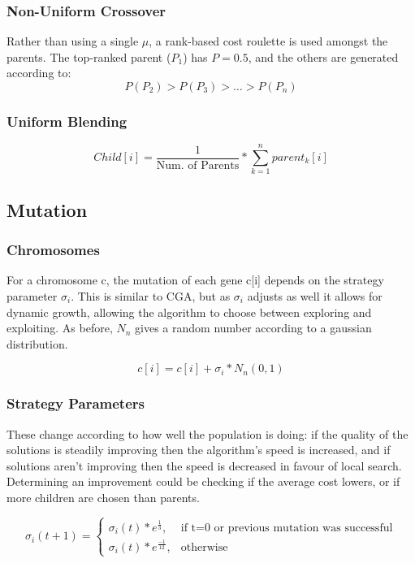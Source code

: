 \subsubsection{Non-Uniform Crossover}
Rather than using a single $\mu$, a rank-based cost roulette is used amongst the parents. The top-ranked parent ($P_1$) has $P =0.5$, and the others are generated according to: 
\[
P(P_2) > P(P_3) > \dotso > P(P_n)
\]

\subsubsection{Uniform Blending}
\[
Child[i] = \frac{1}{\text{Num. of Parents}} * \sum_{k=1}^{n} parent_k[i] 
\]

\subsection{Mutation}
\subsubsection{Chromosomes}
For a chromosome c, the mutation of each gene c[i] depends on the strategy parameter $\sigma_i$. This is similar to CGA, but as $\sigma_i$ adjusts as well it allows for dynamic growth, allowing the algorithm to choose between exploring and exploiting. As before, $N_n$ gives a random number according to a gaussian distribution.

\begin{equation}
    c[i] = c[i] + \sigma_i * N_n(0,1)
\end{equation}

\subsubsection{Strategy Parameters}
These change according to how well the population is doing: if the quality of the solutions is steadily improving then the algorithm's speed is increased, and if solutions aren't improving then the speed is decreased in favour of local search. Determining an improvement could be checking if the average cost lowers, or if more children are chosen than parents.

\begin{equation}
    \sigma_i(t+1) = 
    \begin{cases}
    \sigma_i(t) * e^{\frac{1}{3}}, & \text{if t=0 or previous mutation was successful} \\
    \sigma_i(t) * e^{\frac{-1}{12}}, & \text{otherwise}
    \end{cases}
\end{equation}

